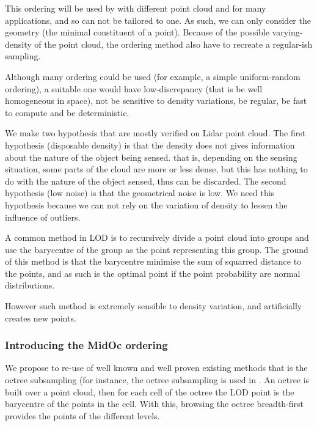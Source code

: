 		This ordering will be used by with different point cloud and for many applications, and so can not be tailored to one.
		As such, we can only consider the geometry (the minimal constituent of a point).
		Because of the possible varying-density of the point cloud, the ordering method also have to recreate a regular-ish sampling.
		
		Although many ordering could be used (for example, a simple uniform-random ordering),
		a suitable one would have low-discrepancy (that is be well homogeneous in space), not be sensitive to density variations, be regular, be fast to compute and be deterministic.
		
		We make two hypothesis that are mostly verified on Lidar point cloud.
		The first hypothesis (disposable density) is that the density does not gives information about the nature of the object being sensed. 
		that is, depending on the sensing situation, some parts of the cloud are more or less dense, but this has nothing to do with the nature of the object sensed, thus can be discarded.
		The second hypothesis (low noise) is that the geometrical noise is low.
		We need this hypothesis because we can not rely on the variation of density to lessen the influence of outliers.
		
		A common method in LOD is to recursively divide a point cloud into groups and use the barycentre of the group as the point representing this group. The ground of this method is that the barycentre minimise the sum of squarred distance to the points, and as such is the optimal point if the point probability are normal distributions.
		
		However such method is extremely sensible to density variation, and artificially creates new points. 
		
		\subsubsection{Introducing the MidOc ordering}
		
		
		We propose to re-use of well known and well proven existing methods that is the octree subsampling (for instance, the octree subsampling is used in \cite{Girardeau-Montaut2014}.
		An octree is built over a point cloud, then for each cell of the octree the LOD point is the barycentre of the points in the cell.  With this, browsing the octree breadth-first provides the points of the different levels.
		
